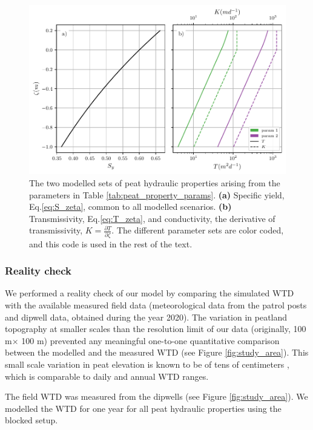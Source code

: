 \documentclass[bg, manuscript]{copernicus}
\begin{document}
\begin{figure}[t]
\includegraphics[width=12 cm]{figs/parameterization.pdf}
\caption{The two modelled sets of peat hydraulic properties arising from the parameters in Table \ref{tab:peat_property_params}. \textbf{(a)} Specific yield, Eq.\eqref{eq:S_zeta}, common to all modelled scenarios. \textbf{(b)} Transmissivity, Eq.\eqref{eq:T_zeta}, and conductivity, the derivative of transmissivity, $K = \frac{\partial T}{\partial \zeta}$. The different parameter sets are color coded, and this code is used in the rest of the text.}
\label{fig:parameterizatioe}
\end{figure}

\subsubsection{Reality check}
We performed a reality check of our model by comparing the simulated WTD with the available measured field data (meteorological data from the patrol posts and dipwell data, obtained during the year 2020).
The variation in peatland topography at smaller scales than the resolution limit of our data (originally, 100 \unit{m}$\times$ 100 \unit{m}) prevented any meaningful one-to-one quantitative comparison between the modelled and the measured WTD (see Figure \ref{fig:study_area}).
This small scale variation in peat elevation is known to be of tens of centimeters \citep{lampelaGroundSurfaceMicrotopography2016, cobbHowTemporalPatterns2017}, which is comparable to daily and annual WTD ranges.

The field WTD was measured from the dipwells (see Figure \ref{fig:study_area}).
We modelled the  WTD for one year for all peat hydraulic properties using the blocked setup. 
\end{document}
